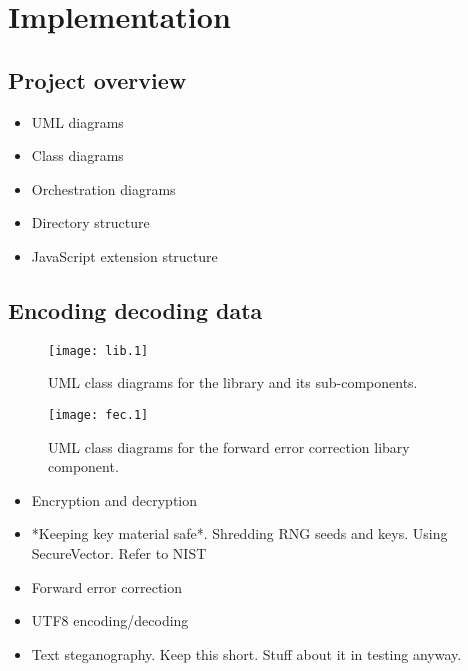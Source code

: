 \chapter{Implementation}\label{ch:implementation}

\section{Project overview}
    
    \begin{itemize}
        \item UML diagrams
        \item Class diagrams
        \item Orchestration diagrams
        \item Directory structure
        \item JavaScript extension structure
    \end{itemize}


\section{Encoding decoding data}

    \begin{figure}[tbp]
        \begin{center}
                \texttt{[image: lib.1]}
            \caption{UML class diagrams for the library and its sub-components.}
            \label{uml:lib-classes}
        \end{center}
    \end{figure}

    \begin{figure}[tbp]
        \begin{center}
                \texttt{[image: fec.1]}
            \caption{UML class diagrams for the forward error correction libary component.}
            \label{uml:fec-classes}
        \end{center}
    \end{figure}

    \begin{itemize}
        \item Encryption and decryption
        \item *Keeping key material safe*. Shredding RNG seeds and keys. Using SecureVector. Refer to NIST
        \item Forward error correction
        \item UTF8 encoding/decoding
        \item Text steganography. Keep this short. Stuff about it in testing anyway.
    \end{itemize}

